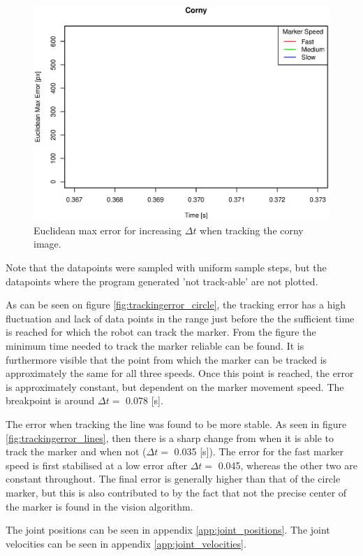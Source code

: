 \begin{figure}[H]
\centering
\includegraphics[width= \fullImageWidth]{graphics/robotics/trackingerror_corny}
\caption{Euclidean max error for increasing $\Delta t$ when tracking the corny image.}
\label{fig:trackingerror_corny}
\end{figure}

Note that the datapoints were sampled with uniform sample steps, but the datapoints where the program generated 'not track-able' are not plotted.

As can be seen on figure \ref{fig:trackingerror_circle}, the tracking error has a high fluctuation and lack of data points in the range just before the the sufficient time is reached for which the robot can track the marker.
From the figure the minimum time needed to track the marker reliable can be found.
It is furthermore visible that the point from which the marker can be tracked is approximately the same for all three speeds.
Once this point is reached, the error is approximately constant, but dependent on the marker movement speed.
The breakpoint is around $\Delta t = $ 0.078 [s].

The error when tracking the line was found to be more stable.
As seen in figure \ref{fig:trackingerror_lines}, then there is a sharp change from when it is able to track the marker and when not ($\Delta t = $ 0.035 [s]).
The error for the fast marker speed is first stabilised at a low error after $\Delta t =$ 0.045, whereas the other two are constant throughout.
The final error is generally higher than that of the circle marker, but this is also contributed to by the fact that not the precise center of the marker is found in the vision algorithm.




The joint positions can be seen in appendix \ref{app:joint_positions}.
The joint velocities can be seen in appendix \ref{app:joint_velocities}.